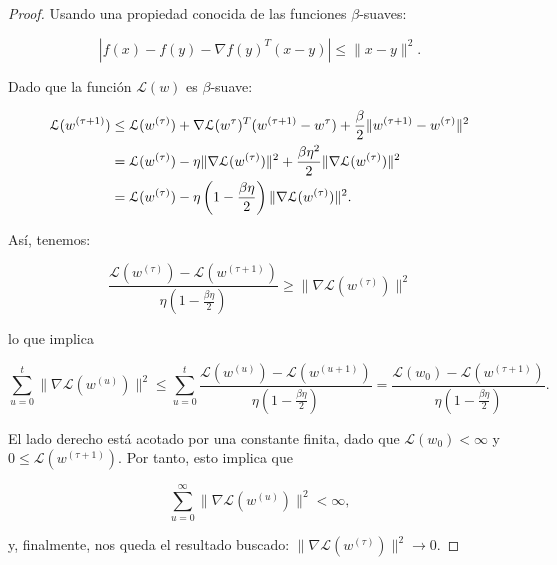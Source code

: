 \begin{proof}
  Usando una propiedad conocida de las funciones $\beta$-suaves:

  \[
      | f(x) - f(y) - \nabla f(y)^{T} (x-y) | \leq \| x - y \|^2.
  \]  

  Dado que la función $\mathcal{L}(w)$ es $\beta$-suave:

  \begin{align}
      \mathcal{L} (w^{(\tau + 1)}) &\leq \mathcal{L} (w^{(\tau)}) + \nabla \mathcal{L} (w^{\tau})^{T} (w^{(\tau + 1)} - w^{\tau}) + \frac{\beta}{2} \|w^{(\tau + 1)} - w^{(\tau)}\|^2 \notag \\
      &= \mathcal{L} (w^{(\tau)}) - \eta \|\nabla \mathcal{L} (w^{(\tau)})\|^2 + \frac{\beta \eta^2}{2} \|\nabla \mathcal{L} (w^{(\tau)})\|^2 \notag \\
      &= \mathcal{L} (w^{(\tau)}) - \eta \left( 1 - \frac{\beta \eta}{2} \right) \|\nabla \mathcal{L} (w^{(\tau)})\|^2.
  \end{align}

  Así, tenemos:

  \[
      \frac{\mathcal{L} (w^{(\tau)}) - \mathcal{L} (w^{(\tau + 1)})}{\eta \left( 1 - \frac{\beta \eta}{2} \right)} \geq \|\nabla \mathcal{L} (w^{(\tau)})\|^2
  \]

  lo que implica

  \[
      \sum_{u=0}^{t} \|\nabla \mathcal{L} (w^{(u)})\|^2 \leq \sum_{u=0}^{t} \frac{\mathcal{L} (w^{(u)}) - \mathcal{L} (w^{(u+1)})}{\eta \left( 1 - \frac{\beta \eta}{2} \right)} = \frac{\mathcal{L} (w_0) - \mathcal{L} (w^{(\tau + 1)})}{\eta \left( 1 - \frac{\beta \eta}{2} \right)}.
  \]

  El lado derecho está acotado por una constante finita, dado que $\mathcal{L} (w_0) < \infty$ y $0 \leq \mathcal{L} (w^{(\tau + 1)})$. Por tanto, esto implica que

  \[
      \sum_{u=0}^{\infty} \|\nabla \mathcal{L} (w^{(u)})\|^2 < \infty,
  \]

  y, finalmente, nos queda el resultado buscado: $\|\nabla \mathcal{L} (w^{(\tau)})\|^2 \to 0$.
\end{proof}

\endinput
